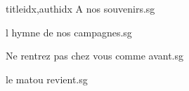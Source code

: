 \documentclass[
    ]{article}
\begin{document}
\begin{songs}{titleidx,authidx}
{A nos souvenirs.sg}


{l hymne de nos campagnes.sg}


{Ne rentrez pas chez vous comme avant.sg}


{le matou revient.sg}

\end{songs}
\end{document}
